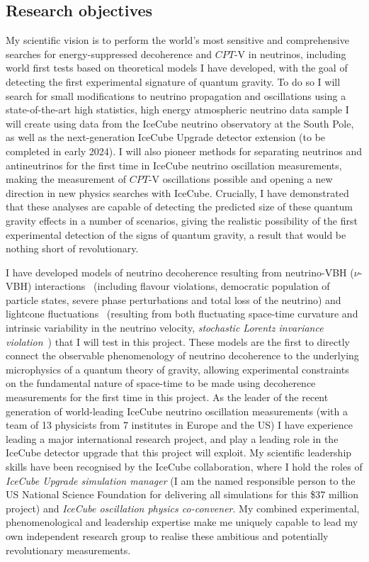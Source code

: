 \documentclass[a4paper,11pt]{article}
\begin{document}
\subsection{Research objectives}

My scientific vision is to perform the world's most sensitive and comprehensive searches for energy-suppressed decoherence and $CPT$-V in neutrinos, including world first tests based on theoretical models I have developed, with the goal of detecting the first experimental signature of quantum gravity. To do so I will search for small modifications to neutrino propagation and oscillations using a state-of-the-art high statistics, high energy atmospheric neutrino data sample I will create using data from the IceCube neutrino observatory at the South Pole, as well as the next-generation IceCube Upgrade detector extension (to be completed in early 2024). I will also pioneer methods for separating neutrinos and antineutrinos for the first time in IceCube neutrino oscillation measurements, making the measurement of $CPT$-V oscillations possible and opening a new direction in new physics searches with IceCube. Crucially, I have demonstrated that these analyses are capable of detecting the predicted size of these quantum gravity effects in a number of scenarios, giving the realistic possibility of the first experimental detection of the signs of quantum gravity, a result that would be nothing short of revolutionary. 

I have developed models of neutrino decoherence resulting from neutrino-VBH ($\nu$-VBH) interactions~\cite{PhysRevD.102.115003} (including flavour violations, democratic population of particle states, severe phase perturbations and total loss of the neutrino) and lightcone fluctuations~\cite{2103.15313} (resulting from both fluctuating space-time curvature and intrinsic variability in the neutrino velocity, \textit{stochastic Lorentz invariance violation}~\cite{Vasileiou2015, Amelino-Camelia:2016fuh}) that I will test in this project. These models are the first to directly connect the observable phenomenology of neutrino decoherence to the underlying microphysics of a quantum theory of gravity, allowing experimental constraints on the fundamental nature of space-time to be made using decoherence measurements for the first time in this project. As the leader of the recent generation of world-leading IceCube neutrino oscillation measurements (with a team of 13 physicists from 7 institutes in Europe and the US) I have experience leading a major international research project, and play a leading role in the IceCube detector upgrade that this project will exploit. My scientific leadership skills have been recognised by the IceCube collaboration, where I hold the roles of \textit{IceCube Upgrade simulation manager} (I am the named responsible person to the US National Science Foundation for delivering all simulations for this \$37 million project) and \textit{IceCube oscillation physics co-convener}. My combined experimental, phenomenological and leadership expertise make me uniquely capable to lead my own independent research group to realise these ambitious and potentially revolutionary measurements. \\
\end{document}
